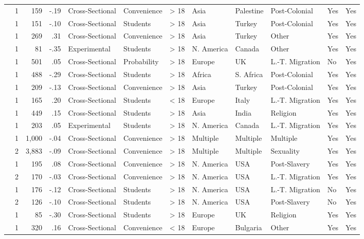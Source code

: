 \documentclass[10pt, letterpaper]{article}
\begin{document}
\begin{landscape}
\begin{xltabular}{650pt}{Xrrrllrlllll}
\cite{3201} & 1 & 159 & -.19 & Cross-Sectional & Convenience & > 18 & Asia & Palestine & Post-Colonial & Yes & Yes\\
\cite{322} & 1 & 151 & -.10 & Cross-Sectional & Students & > 18 & Asia & Turkey & Post-Colonial & Yes & Yes\\
\cite{414} & 1 & 269 & .31 & Cross-Sectional & Convenience & > 18 & Asia & Turkey & Other & Yes & Yes\\
\cite{2075} & 1 & 81 & -.35 & Experimental & Students & > 18 & N. America & Canada & Other & Yes & Yes\\
\cite{2397} & 1 & 501 & .05 & Cross-Sectional & Probability & > 18 & Europe & UK & L.-T. Migration & No & Yes\\
\cite{284} & 1 & 488 & -.29 & Cross-Sectional & Students & > 18 & Africa & S. Africa & Post-Colonial & Yes & Yes\\
\cite{1248} & 1 & 209 & -.13 & Cross-Sectional & Convenience & > 18 & Asia & Turkey & Post-Colonial & Yes & Yes\\
\cite{3196} & 1 & 165 & .20 & Cross-Sectional & Students & < 18 & Europe & Italy & L.-T. Migration & Yes & Yes\\
\cite{93} & 1 & 449 & .15 & Cross-Sectional & Students & > 18 & Asia & India & Religion & Yes & Yes\\
\cite{2033} & 1 & 203 & .05 & Experimental & Students & > 18 & N. America & Canada & L.-T. Migration & Yes & Yes\\
\cite{3054} & 1 & 1,000 & -.04 & Cross-Sectional & Convenience & > 18 & Multiple & Multiple & Multiple & Yes & Yes\\
 & 2 & 3,883 & -.09 & Cross-Sectional & Convenience & > 18 & Multiple & Multiple & Sexuality & Yes & Yes\\
\cite{2309} & 1 & 195 & .08 & Cross-Sectional & Convenience & > 18 & N. America & USA & Post-Slavery & Yes & Yes\\
 & 2 & 170 & -.03 & Cross-Sectional & Convenience & > 18 & N. America & USA & L.-T. Migration & Yes & Yes\\
\cite{894} & 1 & 176 & -.12 & Cross-Sectional & Students & > 18 & N. America & USA & L.-T. Migration & No & Yes\\
 & 2 & 126 & -.10 & Cross-Sectional & Students & > 18 & N. America & USA & Post-Slavery & No & Yes\\
\cite{1376} & 1 & 85 & -.30 & Cross-Sectional & Students & > 18 & Europe & UK & Religion & Yes & Yes\\
\cite{4004} & 1 & 320 & .16 & Cross-Sectional & Convenience & < 18 & Europe & Bulgaria & Other & Yes & Yes\\

\end{xltabular}
\end{landscape}
\end{document}
